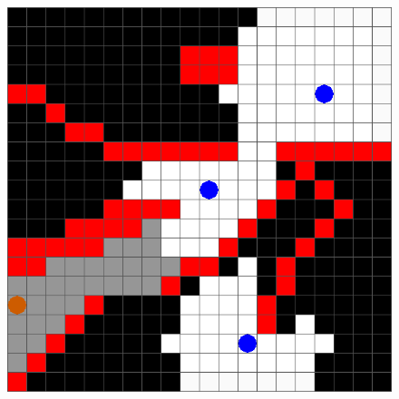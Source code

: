 \begin{figure}
\begin{minipage}{5.0cm}
{			\includegraphics[scale=0.12]{figs/results_t3.png}\hspace{.7cm}
		}
\end{minipage}
\end{figure}
